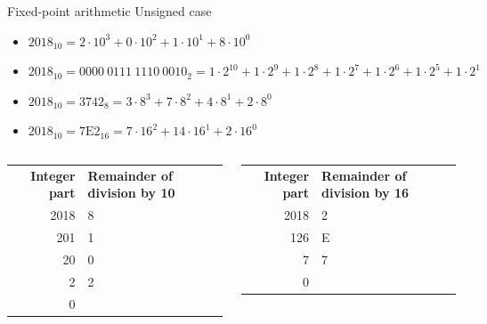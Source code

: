 \documentclass[usenames,dvipsnames,aspectratio=169]{beamer}
\begin{document}
\begin{frame}{Fixed-point arithmetic}
  Unsigned case
  \begin{itemize}
    \item $2018_{10} = 2\cdot10^3 + 0\cdot10^2 + 1\cdot10^1 + 8\cdot10^0$
    \item $2018_{10} = 0000\ 0111\ 1110\ 0010_2 = 1\cdot2^{10} + 1\cdot2^9 +
1\cdot2^8 + 1\cdot2^7 + 1\cdot2^6 + 1\cdot2^5 + 1\cdot2^1$
    \item $2018_{10} = 3742_8 = 3\cdot8^3 + 7\cdot8^2 + 4\cdot8^1 + 2\cdot8^0$
    \item $2018_{10} = \textrm{7E2}_{16} = 7\cdot16^2 + 14\cdot16^1 +
2\cdot16^0$
  \end{itemize}
  \vfill
  \begin{columns}
      \begin{center}
      \begin{tabular}{r|l}
      \tiny\textbf{Integer part} & \tiny\textbf{Remainder of division by 10}\\
      2018 & 8\\
      201 & 1\\
      20 & 0\\
      2 & 2\\
      0 & \\
      \end{tabular}
      \end{center}
      \begin{center}
      \begin{tabular}{r|l}
      \tiny\textbf{Integer part} & \tiny\textbf{Remainder of division by 16}\\
      2018 & 2\\
      126 & E\\
      7 & 7\\
      0 & \\
      \end{tabular}
      \end{center}
  \end{columns}
\end{frame}
\end{document}
